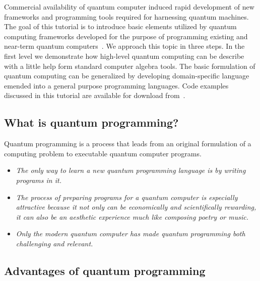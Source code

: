 \documentclass[a4paper,11pt]{article}
\newcommand{\docName}{tutorial\xspace}
\begin{document}
Commercial availability of quantum computer induced rapid development of new 
frameworks and programming tools required for harnessing quantum machines. 
The goal of this \docName is to introduce basic elements utilized by quantum 
computing frameworks developed for the purpose of programming existing and 
near-term quantum  computers~\cite{preskill2018quantum,ibm-qiskit-aqua}. We 
approach this topic in three steps. In the first level we demonstrate how 
high-level quantum computing can be describe with a little help form standard 
computer algebra tools. The basic formulation of quantum computing can be 
generalized by developing domain-specific language emended into a general 
purpose programming languages. Code examples discussed in this \docName are 
available for download from~\cite{qprog-tutor}.

\subsection{What is quantum programming?}
Quantum programming is a process that leads from an original formulation of a 
computing problem to executable quantum computer programs.

\begin{itemize}

\item \emph{The only way to learn a new quantum programming language is 
    by writing programs in it.}

\item \emph{The process of preparing programs for a quantum computer is 
    especially attractive because it not only can be economically and 
    scientifically rewarding, it can also be an aesthetic experience much like 
    composing poetry or music.}

\item \emph{Only the modern quantum computer has made quantum 
    programming both challenging and relevant.}

\end{itemize}

\subsection{Advantages of quantum programming}
\end{document}
